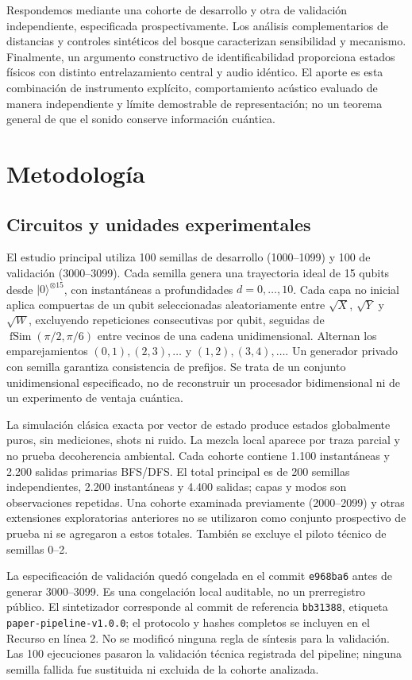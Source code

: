 \documentclass[pdflatex,iicol,sn-basic,Numbered]{sn-jnl}
\begin{document}
Respondemos mediante una cohorte de desarrollo y otra de validación independiente, especificada prospectivamente. Los análisis complementarios de distancias y controles sintéticos del bosque caracterizan sensibilidad y mecanismo. Finalmente, un argumento constructivo de identificabilidad proporciona estados físicos con distinto entrelazamiento central y audio idéntico. El aporte es esta combinación de instrumento explícito, comportamiento acústico evaluado de manera independiente y límite demostrable de representación; no un teorema general de que el sonido conserve información cuántica.

\section{Metodología}\label{sec:methods}
\subsection{Circuitos y unidades experimentales}
El estudio principal utiliza 100 semillas de desarrollo (1000--1099) y 100 de validación (3000--3099). Cada semilla genera una trayectoria ideal de 15 qubits desde $|0\rangle^{\otimes15}$, con instantáneas a profundidades $d=0,\ldots,10$. Cada capa no inicial aplica compuertas de un qubit seleccionadas aleatoriamente entre $\sqrt X$, $\sqrt Y$ y $\sqrt W$, excluyendo repeticiones consecutivas por qubit, seguidas de $\operatorname{fSim}(\pi/2,\pi/6)$ entre vecinos de una cadena unidimensional. Alternan los emparejamientos $(0,1),(2,3),\ldots$ y $(1,2),(3,4),\ldots$. Un generador privado con semilla garantiza consistencia de prefijos. Se trata de un conjunto unidimensional especificado, no de reconstruir un procesador bidimensional ni de un experimento de ventaja cuántica.

La simulación clásica exacta por vector de estado produce estados globalmente puros, sin mediciones, shots ni ruido. La mezcla local aparece por traza parcial y no prueba decoherencia ambiental. Cada cohorte contiene 1.100 instantáneas y 2.200 salidas primarias BFS/DFS. El total principal es de 200 semillas independientes, 2.200 instantáneas y 4.400 salidas; capas y modos son observaciones repetidas. Una cohorte examinada previamente (2000--2099) y otras extensiones exploratorias anteriores no se utilizaron como conjunto prospectivo de prueba ni se agregaron a estos totales. También se excluye el piloto técnico de semillas 0--2.

La especificación de validación quedó congelada en el commit \texttt{e968ba6} antes de generar 3000--3099. Es una congelación local auditable, no un prerregistro público. El sintetizador corresponde al commit de referencia \texttt{bb31388}, etiqueta \texttt{paper-pipeline-v1.0.0}; el protocolo y hashes completos se incluyen en el Recurso en línea 2. No se modificó ninguna regla de síntesis para la validación. Las 100 ejecuciones pasaron la validación técnica registrada del pipeline; ninguna semilla fallida fue sustituida ni excluida de la cohorte analizada.
\end{document}
